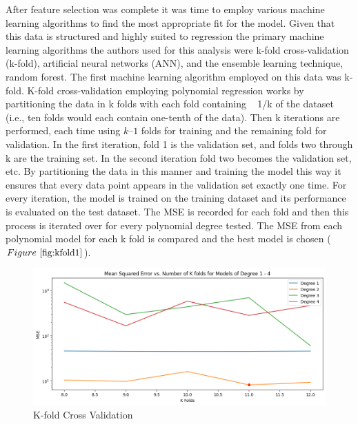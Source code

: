 \documentclass[conference, 11pt]{IEEEtran}
\begin{document}
After feature selection was complete it was time to employ various machine learning algorithms to find the most appropriate fit for the model. Given that this data is structured and highly suited to regression the primary machine learning algorithms the authors used for this analysis were k-fold cross-validation (k-fold), artificial neural networks (ANN), and the ensemble learning technique, random forest.
The first machine learning algorithm employed on this data was k-fold. K-fold cross-validation employing polynomial regression works by partitioning the data in k folds with each fold containing ~ 1/k of the dataset (i.e., ten folds would each contain one-tenth of the data). Then k iterations are performed, each time using $k – 1$ folds for training and the remaining fold for validation. In the first iteration, fold 1 is the validation set, and folds two through k are the training set. In the second iteration fold two becomes the validation set, etc. By partitioning the data in this manner and training the model this way it ensures that every data point appears in the validation set exactly one time. For every iteration, the model is trained on the training dataset and its performance is evaluated on the test dataset. The MSE is recorded for each fold and then this process is iterated over for every polynomial degree tested. The MSE from each polynomial model for each k fold is compared and the best model is chosen ($Figure~\ref{fig:kfold1}$).

\begin{figure}
    \centering
    \includegraphics[width=1\linewidth]{K-fold plot.png}
    \caption{K-fold Cross Validation}
    \label{fig:kfold1}
\end{figure}
\end{document}
